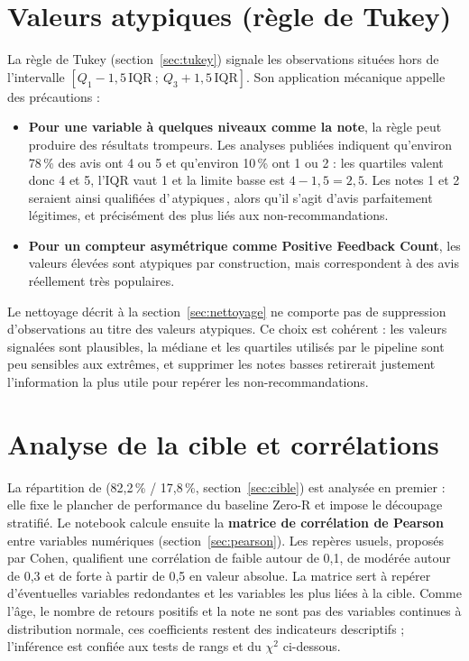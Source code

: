 \documentclass[11pt,a4paper]{report}
\makeatletter
\def\og{\guillemotleft\nobreak\,}%
\def\fg{\unskip\nobreak\,\guillemotright}%
\newcommand{\gl}[1]{\og #1\fg{}}       %
\numberwithin{equation}{chapter}
\DeclareRobustCommand{\code}[1]{{\ttfamily\fontsize{\strip@pt\dimexpr\f@size pt*9/10\relax}{\f@baselineskip}\selectfont\detokenize{#1}}}
\makeatother
\begin{document}
\section{Valeurs atypiques (règle de Tukey)}
La règle de Tukey (section~\ref{sec:tukey}) signale les observations situées hors de l'intervalle $[Q_1 - 1{,}5\,\mathrm{IQR}\ ;\ Q_3 + 1{,}5\,\mathrm{IQR}]$. Son application mécanique appelle des précautions :
\begin{itemize}
\item \textbf{Pour une variable à quelques niveaux comme la note}, la règle peut produire des résultats trompeurs. Les analyses publiées indiquent qu'environ 78\,\% des avis ont 4 ou 5 et qu'environ 10\,\% ont 1 ou 2 : les quartiles valent donc 4 et 5, l'IQR vaut 1 et la limite basse est $4 - 1{,}5 = 2{,}5$. Les notes 1 et 2 seraient ainsi qualifiées d'\gl{atypiques}, alors qu'il s'agit d'avis parfaitement légitimes, et précisément des plus liés aux non-recommandations.
\item \textbf{Pour un compteur asymétrique comme Positive Feedback Count}, les valeurs élevées sont atypiques par construction, mais correspondent à des avis réellement très populaires.
\end{itemize}
Le nettoyage décrit à la section~\ref{sec:nettoyage} ne comporte pas de suppression d'observations au titre des valeurs atypiques. Ce choix est cohérent : les valeurs signalées sont plausibles, la médiane et les quartiles utilisés par le pipeline sont peu sensibles aux extrêmes, et supprimer les notes basses retirerait justement l'information la plus utile pour repérer les non-recommandations.

\section{Analyse de la cible et corrélations}
La répartition de \code{Recommended IND} (82,2\,\% / 17,8\,\%, section~\ref{sec:cible}) est analysée en premier : elle fixe le plancher de performance du baseline Zero-R et impose le découpage stratifié. Le notebook calcule ensuite la \textbf{matrice de corrélation de Pearson} entre variables numériques (section~\ref{sec:pearson}). Les repères usuels, proposés par Cohen, qualifient une corrélation de faible autour de 0,1, de modérée autour de 0,3 et de forte à partir de 0,5 en valeur absolue. La matrice sert à repérer d'éventuelles variables redondantes et les variables les plus liées à la cible. Comme l'âge, le nombre de retours positifs et la note ne sont pas des variables continues à distribution normale, ces coefficients restent des indicateurs descriptifs ; l'inférence est confiée aux tests de rangs et du $\chi^2$ ci-dessous.
\end{document}
